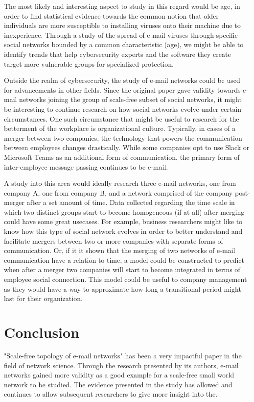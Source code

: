 \documentclass[11pt]{article}
\begin{document}
\begin{multicols}{2}
The most likely and interesting aspect to study in this regard would be age, in order to find statistical evidence towards the common notion that older individuals are more susceptible to installing viruses onto their machine due to inexperience. Through a study of the spread of e-mail viruses through specific social networks bounded by a common characteristic (age), we might be able to identify trends that help cybersecurity experts and the software they create target more vulnerable groups for specialized protection.

Outside the realm of cybersecurity, the study of e-mail networks could be used for advancements in other fields. Since the original paper gave validity towards e-mail networks joining the group of scale-free subset of social networks, it might be interesting to continue research on how social networks evolve under certain circumstances. One such circumstance that might be useful to research for the betterment of the workplace is organizational culture. Typically, in cases of a merger between two companies, the technology that powers the communication between employees changes drastically. While some companies opt to use Slack or Microsoft Teams as an additional form of communication, the primary form of inter-employee message passing continues to be e-mail. 

A study into this area would ideally research three e-mail networks, one from company A, one from company B, and a network comprised of the company post-merger after a set amount of time. Data collected regarding the time scale in which two distinct groups start to become homogeneous (if at all) after merging could have some great usecases. For example, business researchers might like to know how this type of social network evolves in order to better understand and facilitate mergers between two or more companies with separate forms of communication. Or, if it it shown that the merging of two networks of e-mail communication have a relation to time, a model could be constructed to predict when after a merger two companies will start to become integrated in terms of employee social connection. This model could be useful to company management as they would have a way to approximate how long a transitional period might last for their organization.

\section{Conclusion}
\hspace*{\parindent}"Scale-free topology of e-mail networks" has been a very impactful paper in the field of network science. Through the research presented by its authors, e-mail networks gained more validity as a good example for a scale-free small world network to be studied. The evidence presented in the study has allowed and continues to allow subsequent researchers to give more insight into the. 


\end{multicols}
\end{document}
